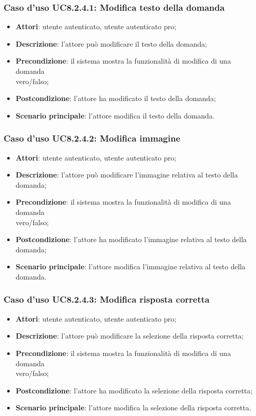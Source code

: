 \subsubsection{Caso d'uso UC8.2.4.1: Modifica testo della domanda}
	\begin{itemize}
		\item
			\textbf{Attori}: utente autenticato, utente autenticato pro;
		\item		
			\textbf{Descrizione}: l'attore può modificare il testo della domanda;
		\item
			\textbf{Precondizione}: il sistema mostra la funzionalità di modifica di una domanda \\vero/falso; 
		\item
			\textbf{Postcondizione}: l'attore ha modificato il testo della domanda;
		\item
			\textbf{Scenario principale}: l'attore modifica il testo della domanda. 
	\end{itemize}
	
\subsubsection{Caso d'uso UC8.2.4.2: Modifica immagine}
	\begin{itemize}
		\item
			\textbf{Attori}: utente autenticato, utente autenticato pro;
		\item		
			\textbf{Descrizione}: l'attore può modificare l'immagine relativa al testo della domanda;
		\item
			\textbf{Precondizione}: il sistema mostra la funzionalità di modifica di una domanda \\vero/falso; 
		\item
			\textbf{Postcondizione}: l'attore ha modificato l'immagine relativa al testo della domanda;
		\item
			\textbf{Scenario principale}: l'attore modifica l'immagine relativa al testo della domanda. 	
	\end{itemize}
	
\subsubsection{Caso d'uso UC8.2.4.3: Modifica risposta corretta}
	\begin{itemize}
		\item
			\textbf{Attori}: utente autenticato, utente autenticato pro;
		\item		
			\textbf{Descrizione}: l'attore può modificare la selezione della risposta corretta;
		\item
			\textbf{Precondizione}: il sistema mostra la funzionalità di modifica di una domanda \\vero/falso; 
		\item
			\textbf{Postcondizione}: l'attore ha modificato la selezione della risposta corretta;
		\item
			\textbf{Scenario principale}: l'attore modifica la selezione della risposta corretta.	 			
	\end{itemize}
	
